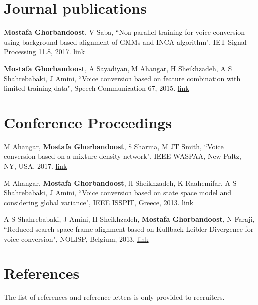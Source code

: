\documentclass[letterpaper,11pt]{article}
\begin{document}
\vspace{-25pt}


\section{Journal publications}
\begin{enumerate}[noitemsep, leftmargin=*,label={[\arabic*]}]
\item{\textbf{Mostafa Ghorbandoost}, V Saba, ``Non-parallel training for voice conversion using background-based alignment of GMMs and INCA algorithm", IET Signal Processing 11.8, 2017. \href{https://ietresearch.onlinelibrary.wiley.com/doi/10.1049/iet-spr.2016.0693}{link}}
\vspace{5pt}
\item{\textbf{Mostafa Ghorbandoost}, A Sayadiyan, M Ahangar, H Sheikhzadeh, A S Shahrebabaki, J Amini, ``Voice conversion based on feature combination with limited training data", Speech Communication 67, 2015. \href{https://www.sciencedirect.com/science/article/abs/pii/S0167639314000892}{link}}
\end{enumerate}

\section{Conference Proceedings}
\begin{enumerate}[noitemsep, leftmargin=*,label={[\arabic*]}]
\item{M Ahangar, \textbf{Mostafa Ghorbandoost}, S Sharma, M JT Smith, ``Voice conversion based on a mixture density network", IEEE WASPAA, New Paltz, NY, USA, 2017. \href{https://ieeexplore.ieee.org/document/8170049}{link}}
\vspace{5pt}
\item{M Ahangar, \textbf{Mostafa Ghorbandoost}, H Sheikhzadeh, K Raahemifar, A S Shahrebabaki, J Amini, ``Voice conversion based on state space model and considering global variance", IEEE ISSPIT, Greece, 2013. \href{https://ieeexplore.ieee.org/document/6781917}{link}}
\vspace{5pt}
\item{A S Shahrebabaki, J Amini, H Sheikhzadeh, \textbf{Mostafa Ghorbandoost}, N Faraji, ``Reduced search space frame alignment based on Kullback-Leibler Divergence for voice conversion", NOLISP, Belgium, 2013. \href{https://link.springer.com/chapter/10.1007/978-3-642-38847-7_11}{link}}
\end{enumerate}


\section{References}
The list of references and reference letters is only provided to recruiters.

\end{document}
